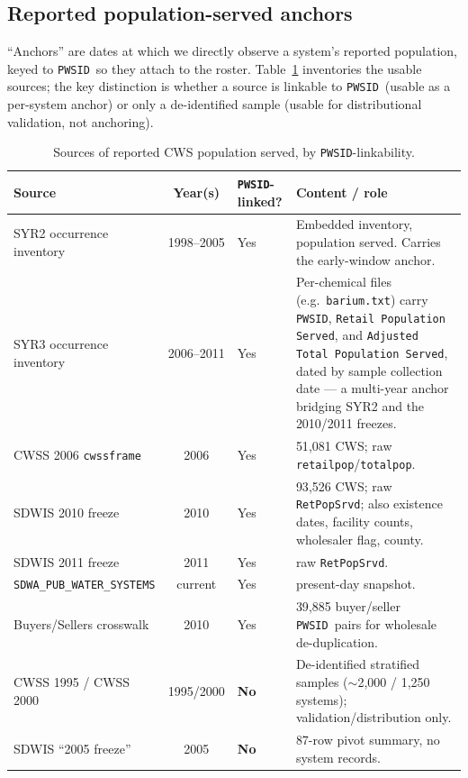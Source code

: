 \documentclass[11pt]{article}
\newcommand{\PWSID}{\texttt{PWSID}}
\begin{document}
\subsection{Reported population-served anchors}
``Anchors'' are dates at which we directly observe a system's reported population,
keyed to \PWSID\ so they attach to the roster. Table~\ref{tab:anchors} inventories
the usable sources; the key distinction is whether a source is linkable to \PWSID\
(usable as a per-system anchor) or only a de-identified sample (usable for
distributional validation, not anchoring).

\begin{table}[ht]
\centering
\caption{Sources of reported CWS population served, by \PWSID-linkability.}
\label{tab:anchors}
\small
\begin{tabular}{@{}p{4.5cm}cp{2.1cm}p{5.4cm}@{}}
\toprule
Source & Year(s) & \PWSID-linked? & Content / role \\
\midrule
SYR2 occurrence inventory & 1998--2005 & Yes & Embedded inventory, population served. Carries the early-window anchor. \\
SYR3 occurrence inventory & 2006--2011 & Yes & Per-chemical files (e.g.\ \texttt{barium.txt}) carry \PWSID, \texttt{Retail Population Served}, and \texttt{Adjusted Total Population Served}, dated by sample collection date --- a multi-year anchor bridging SYR2 and the 2010/2011 freezes. \\
CWSS 2006 \texttt{cwssframe} & 2006 & Yes & 51{,}081 CWS; raw \texttt{retailpop}/\texttt{totalpop}. \\
SDWIS 2010 freeze & 2010 & Yes & 93{,}526 CWS; raw \texttt{RetPopSrvd}; also existence dates, facility counts, wholesaler flag, county. \\
SDWIS 2011 freeze & 2011 & Yes & raw \texttt{RetPopSrvd}. \\
\texttt{SDWA\_PUB\_WATER\_SYSTEMS} & current & Yes & present-day snapshot. \\
Buyers/Sellers crosswalk & 2010 & Yes & 39{,}885 buyer/seller \PWSID\ pairs for wholesale de-duplication. \\
\midrule
CWSS 1995 / CWSS 2000 & 1995/2000 & \textbf{No} & De-identified stratified samples ($\sim$2{,}000 / 1{,}250 systems); validation/distribution only. \\
SDWIS ``2005 freeze'' & 2005 & \textbf{No} & 87-row pivot summary, no system records. \\
\bottomrule
\end{tabular}
\end{table}
\end{document}
